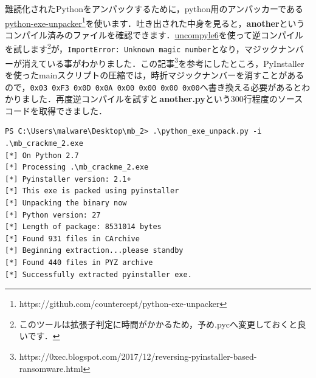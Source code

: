 難読化されたPythonをアンパックするために，python用のアンパッカーである\href{https://github.com/countercept/python-exe-unpacker}{python-exe-unpacker}\footnote{https://github.com/countercept/python-exe-unpacker}を使います．吐き出された中身を見ると，\textbf{another}というコンパイル済みのファイルを確認できます．\href{https://github.com/rocky/python-uncompyle6}{uncompyle6}を使って逆コンパイルを試します\footnote{このツールは拡張子判定に時間がかかるため，予め.pycへ変更しておくと良いです．}が，\texttt{ImportError: Unknown magic number}となり，マジックナンバーが消えている事がわかりました．この記事\footnote{https://0xec.blogspot.com/2017/12/reversing-pyinstaller-based-ransomware.html}を参考にしたところ，PyInstallerを使ったmainスクリプトの圧縮では，時折マジックナンバーを消すことがあるので，\texttt{0x03 0xF3 0x0D 0x0A 0x00 0x00 0x00 0x00}へ書き換える必要があるとわかりました．再度逆コンパイルを試すと\faFileCodeO \,\textbf{another.py}という300行程度のソースコードを取得できました．

\begin{tcolorbox}[title=アンパック, sharp corners, left=2mm]\scriptsize
\begin{verbatim}
PS C:\Users\malware\Desktop\mb_2> .\python_exe_unpack.py -i .\mb_crackme_2.exe
[*] On Python 2.7
[*] Processing .\mb_crackme_2.exe
[*] Pyinstaller version: 2.1+
[*] This exe is packed using pyinstaller
[*] Unpacking the binary now
[*] Python version: 27
[*] Length of package: 8531014 bytes
[*] Found 931 files in CArchive
[*] Beginning extraction...please standby
[*] Found 440 files in PYZ archive
[*] Successfully extracted pyinstaller exe.
\end{verbatim}
\end{tcolorbox}

